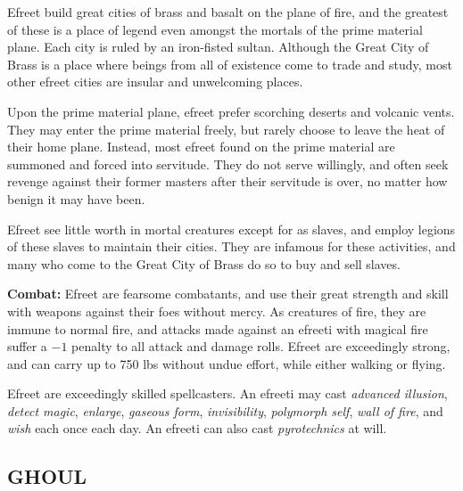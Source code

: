 \begin{multicols}{2}
Efreet build great cities of brass and basalt on the plane of fire, and the greatest of these is a place of legend even amongst the mortals of the prime material plane. Each city is ruled by an iron-fisted sultan. Although the Great City of Brass is a place where beings from all of existence come to trade and study, most other efreet cities are insular and unwelcoming places.

Upon the prime material plane, efreet prefer scorching deserts and volcanic vents. They may enter the prime material freely, but rarely choose to leave the heat of their home plane. Instead, most efreet found on the prime material are summoned and forced into servitude. They do not serve willingly, and often seek revenge against their former masters after their servitude is over, no matter how benign it may have been.

Efreet see little worth in mortal creatures except for as slaves, and employ legions of these slaves to maintain their cities. They are infamous for these activities, and many who come to the Great City of Brass do so to buy and sell slaves.

\textbf{Combat:} Efreet are fearsome combatants, and use their great strength and skill with weapons against their foes without mercy. As creatures of fire, they are immune to normal fire, and attacks made against an efreeti with magical fire suffer a $-1$ penalty to all attack and damage rolls. Efreet are exceedingly strong, and can carry up to 750 lbs without undue effort, while either walking or flying.

Efreet are exceedingly skilled spellcasters. An efreeti may cast \textit{advanced illusion}, \textit{detect magic}, \textit{enlarge}, \textit{gaseous form}, \textit{invisibility}, \textit{polymorph self}, \textit{wall of fire}, and \textit{wish} each once each day. An efreeti can also cast \textit{pyrotechnics} at will.

\noindent \begin{minipage}{\columnwidth}

\vspace{1em}

\subsection{GHOUL}


\end{minipage}
\end{multicols}
